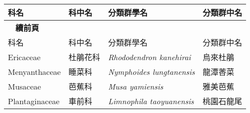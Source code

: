     \begin{longtable}{p{3cm}p{2cm}p{5cm}p{3cm}}
    \toprule
      科名 & 科中名 & 分類群學名 & 分類群中名  \\
    \midrule 
    \endfirsthead
    
    {{\bfseries \tablename\ \thetable{} 續前頁 }} \\
    科名 & 科中名 & 分類群學名 & 分類群中名  \\
    \midrule
    \endhead
    Ericaceae & 杜鵑花科 & \textit{Rhododendron kanehirai}  & 烏來杜鵑\\
    Menyanthaceae & 睡菜科 & \textit{Nymphoides lungtanensis}  & 龍潭莕菜\\
    Musaceae & 芭蕉科 & \textit{Musa yamiensis}  & 雅美芭蕉\\
    Plantaginaceae & 車前科 & \textit{Limnophila taoyuanensis}  & 桃園石龍尾\\
    \bottomrule
    \end{longtable}
